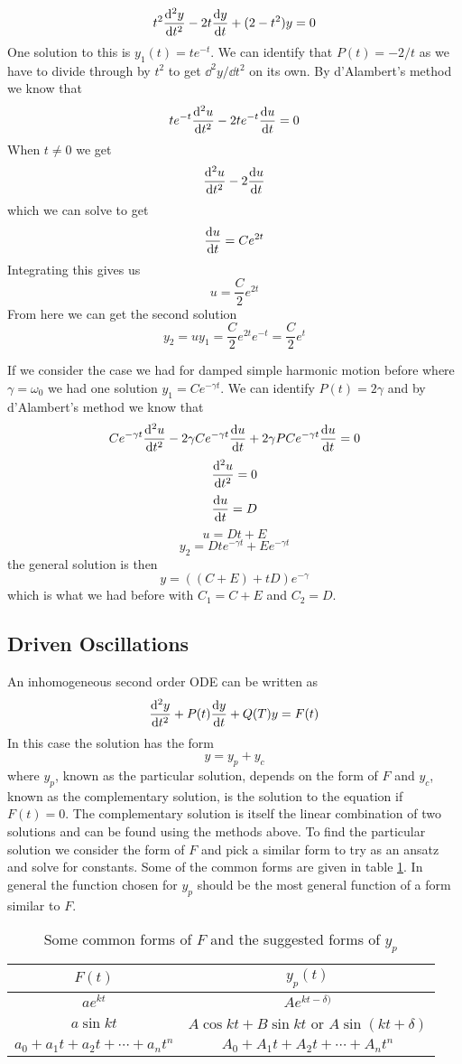 \documentclass{article}
\begin{document}
    \example
    \[t^2\dv[2]{y}{t} - 2t\dv{y}{t} + (2 - t^2)y = 0\]
    One solution to this is \(y_1(t) = te^{-t}\).
    We can identify that \(P(t) = -2/t\) as we have to divide through by \(t^2\) to get \(\dd^2 y/\dd t^2\)  on its own.
    By d'Alambert's method we know that
    \[te^{-t}\dv[2]{u}{t} - 2te^{-t}\dv{u}{t} = 0\]
    When \(t\ne 0\) we get
    \[\dv[2]{u}{t} - 2\dv{u}{t}\]
    which we can solve to get
    \[\dv{u}{t} = Ce^{2t}\]
    Integrating this gives us
    \[u = \frac{C}{2}e^{2t}\]
    From here we can get the second solution
    \[y_2 = uy_1 = \frac{C}{2}e^{2t}e^{-t} = \frac{C}{2}e^{t}\]
    
    If we consider the case we had for damped simple harmonic motion before where \(\gamma = \omega_0\) we had one solution \(y_1 = Ce^{-\gamma t}\).
    We can identify \(P(t) = 2\gamma\) and by d'Alambert's method we know that
    \[Ce^{-\gamma t}\dv[2]{u}{t} - 2\gamma C e^{-\gamma t}\dv{u}{t} + 2\gamma PCe^{-\gamma t}\dv{u}{t} = 0\]
    \[\dv[2]{u}{t} = 0\]
    \[\dv{u}{t} = D\]
    \[u = Dt + E\]
    \[y_2 = Dte^{-\gamma t} + Ee^{-\gamma t}\]
    the general solution is then
    \[y = ((C + E) + tD)e^{-\gamma}\]
    which is what we had before with \(C_1 = C + E\) and \(C_2 = D\).
    
    \subsection{Driven Oscillations}
    An inhomogeneous second order ODE can be written as
    \[\dv[2]{y}{t} + P(t)\dv{y}{t} + Q(T)y = F(t)\]
    In this case the solution has the form
    \[y = y_p + y_c\]
    where \(y_p\), known as the particular solution, depends on the form of \(F\) and \(y_c\), known as the complementary solution, is the solution to the equation if \(F(t) = 0\).
    The complementary solution is itself the linear combination of two solutions and can be found using the methods above.
    To find the particular solution we consider the form of \(F\) and pick a similar form to try as an ansatz and solve for constants.
    Some of the common forms are given in table \ref{tab:F and y_p}.
    In general the function chosen for \(y_p\) should be the most general function of a form similar to \(F\).
    \begin{table}[ht]
        \centering
        \begin{tabular}{c|c}\hline
            \(F(t)\) & \(y_p(t)\) \\\hline
            \(ae^{kt}\) & \(Ae^{kt - \delta)}\)\\
            \(a\sin kt\) & \(A\cos kt + B\sin kt\) or \(A\sin(kt + \delta)\)\\
            \(a_0 + a_1t + a_2 t+\dotsb+ a_nt^n\) & \(A_0 + A_1t + A_2 t+\dotsb+ A_nt^n\)\\\hline
        \end{tabular}
        \caption{Some common forms of \(F\) and the suggested forms of \(y_p\)}
        \label{tab:F and y_p}
    \end{table}
\end{document}
